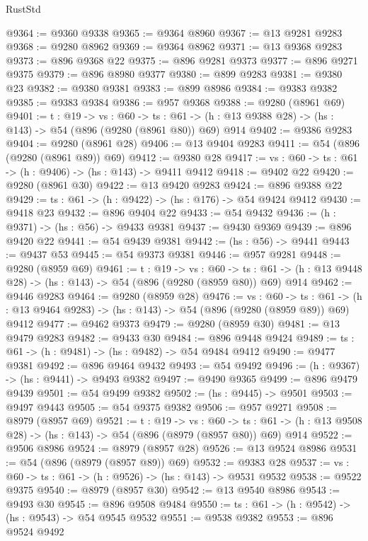 \begin{lexlean}{RustStd}
\begin{coremodule}
@9364 := @9360 @9338
@9365 := @9364 @8960
@9367 := @13 @9281 @9283
@9368 := @9280 @8962
@9369 := @9364 @8962
@9371 := @13 @9368 @9283
@9373 := @896 @9368 @22
@9375 := @896 @9281 @9373
@9377 := @896 @9271 @9375
@9379 := @896 @8980 @9377
@9380 := @899 @9283
@9381 := @9380 @23
@9382 := @9380 @9381
@9383 := @899 @8986
@9384 := @9383 @9382
@9385 := @9383 @9384
@9386 := @957 @9368
@9388 := @9280 (@8961 @69)
@9401 := {t : @19} ->
  {vs : @60} ->
  {ts : @61} -> (h : @13 @9388 @28) -> (hs : @143) -> @54 (@896 (@9280 (@8961 @80)) @69) @914
@9402 := @9386 @9283
@9404 := @9280 (@8961 @28)
@9406 := @13 @9404 @9283
@9411 := @54 (@896 (@9280 (@8961 @89)) @69)
@9412 := @9380 @28
@9417 := {vs : @60} -> {ts : @61} -> (h : @9406) -> (hs : @143) -> @9411 @9412
@9418 := @9402 @22
@9420 := @9280 (@8961 @30)
@9422 := @13 @9420 @9283
@9424 := @896 @9388 @22
@9429 := {ts : @61} -> (h : @9422) -> (hs : @176) -> @54 @9424 @9412
@9430 := @9418 @23
@9432 := @896 @9404 @22
@9433 := @54 @9432
@9436 := (h : @9371) -> (hs : @56) -> @9433 @9381
@9437 := @9430 @9369
@9439 := @896 @9420 @22
@9441 := @54 @9439 @9381
@9442 := (hs : @56) -> @9441
@9443 := @9437 @53
@9445 := @54 @9373 @9381
@9446 := @957 @9281
@9448 := @9280 (@8959 @69)
@9461 := {t : @19} ->
  {vs : @60} ->
  {ts : @61} -> (h : @13 @9448 @28) -> (hs : @143) -> @54 (@896 (@9280 (@8959 @80)) @69) @914
@9462 := @9446 @9283
@9464 := @9280 (@8959 @28)
@9476 := {vs : @60} ->
  {ts : @61} -> (h : @13 @9464 @9283) -> (hs : @143) -> @54 (@896 (@9280 (@8959 @89)) @69) @9412
@9477 := @9462 @9373
@9479 := @9280 (@8959 @30)
@9481 := @13 @9479 @9283
@9482 := @9433 @30
@9484 := @896 @9448 @9424
@9489 := {ts : @61} -> (h : @9481) -> (hs : @9482) -> @54 @9484 @9412
@9490 := @9477 @9381
@9492 := @896 @9464 @9432
@9493 := @54 @9492
@9496 := (h : @9367) -> (hs : @9441) -> @9493 @9382
@9497 := @9490 @9365
@9499 := @896 @9479 @9439
@9501 := @54 @9499 @9382
@9502 := (hs : @9445) -> @9501
@9503 := @9497 @9443
@9505 := @54 @9375 @9382
@9506 := @957 @9271
@9508 := @8979 (@8957 @69)
@9521 := {t : @19} ->
  {vs : @60} ->
  {ts : @61} -> (h : @13 @9508 @28) -> (hs : @143) -> @54 (@896 (@8979 (@8957 @80)) @69) @914
@9522 := @9506 @8986
@9524 := @8979 (@8957 @28)
@9526 := @13 @9524 @8986
@9531 := @54 (@896 (@8979 (@8957 @89)) @69)
@9532 := @9383 @28
@9537 := {vs : @60} -> {ts : @61} -> (h : @9526) -> (hs : @143) -> @9531 @9532
@9538 := @9522 @9375
@9540 := @8979 (@8957 @30)
@9542 := @13 @9540 @8986
@9543 := @9493 @30
@9545 := @896 @9508 @9484
@9550 := {ts : @61} -> (h : @9542) -> (hs : @9543) -> @54 @9545 @9532
@9551 := @9538 @9382
@9553 := @896 @9524 @9492

\end{coremodule}
\end{lexlean}
